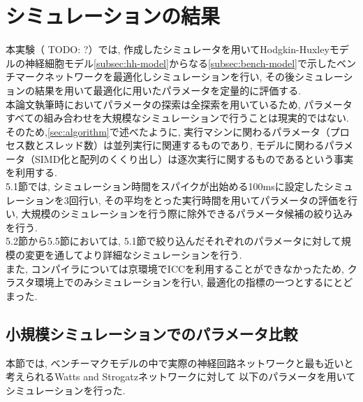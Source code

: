 \section{シミュレーションの結果}
\label{sec:sim-result}
本実験（ TODO: ?）では, 作成したシミュレータを用いてHodgkin-Huxleyモデルの神経細胞モデル\ref{subsec:hh-model}からなる\ref{subsec:bench-model}で示したベンチマークネットワークを最適化しシミュレーションを行い,
その後シミュレーションの結果を用いて最適化に用いたパラメータを定量的に評価する.\\
本論文執筆時においてパラメータの探索は全探索を用いているため, パラメータすべての組み合わせを大規模なシミュレーションで行うことは現実的ではない.
そのため,\ref{sec:algorithm}で述べたように, 実行マシンに関わるパラメータ（プロセス数とスレッド数）は並列実行に関連するものであり,
モデルに関わるパラメータ（SIMD化と配列のくくり出し）は逐次実行に関するものであるという事実を利用する.\\
5.1節では, シミュレーション時間をスパイクが出始める100msに設定したシミュレーションを3回行い,
その平均をとった実行時間を用いてパラメータの評価を行い, 大規模のシミュレーションを行う際に除外できるパラメータ候補の絞り込みを行う.\\
5.2節から5.5節においては, 5.1節で絞り込んだそれぞれのパラメータに対して規模の変更を通してより詳細なシミュレーションを行う.\\
また, コンパイラについては京環境でICCを利用することができなかったため, クラスタ環境上でのみシミュレーションを行い,
最適化の指標の一つとするにとどまった.\\

\subsection{小規模シミュレーションでのパラメータ比較}
\label{subsec:small-sim}
本節では, ベンチーマクモデルの中で実際の神経回路ネットワークと最も近いと考えられるWatts and Strogatzネットワークに対して
以下のパラメータを用いてシミュレーションを行った.\\
